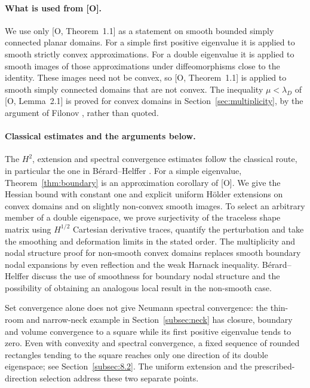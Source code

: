 \documentclass[11pt]{article}
\theoremstyle{definition}
\theoremstyle{remark}
\numberwithin{equation}{section}
\begin{document}
\paragraph{What is used from [O].}
We use only [O, Theorem~1.1] as a statement on smooth bounded simply connected planar domains. For a simple
first positive eigenvalue it is applied to smooth strictly convex approximations. For a double eigenvalue
it is applied to smooth images of those approximations under diffeomorphisms close to the identity. These
images need not be convex, so [O, Theorem~1.1] is applied to smooth simply connected domains that are not
convex. The inequality $\mu<\lambda_D$ of [O, Lemma~2.1] is proved for convex domains in
Section~\ref{sec:multiplicity}, by the argument of Filonov \cite{Filonov}, rather than quoted.

\paragraph{Classical estimates and the arguments below.}
The $H^2$, extension and spectral convergence estimates follow the classical route, in particular the one
in B\'erard--Helffer \cite[Section~2]{BH2021}. For a simple eigenvalue, Theorem~\ref{thm:boundary} is an
approximation corollary of [O]. We give the Hessian bound with constant one and explicit uniform H\"older
extensions on convex domains and on slightly non-convex smooth images. To select an arbitrary member of a
double eigenspace, we prove surjectivity of the traceless shape matrix using $H^{1/2}$ Cartesian derivative
traces, quantify the perturbation and take the smoothing and deformation limits in the stated order.
The multiplicity and nodal structure proof for non-smooth convex domains replaces smooth boundary nodal
expansions by even reflection and the weak Harnack inequality. B\'erard--Helffer
\cite[Remark~3.7(2)]{BH2021} discuss the use of smoothness for boundary nodal structure and the possibility of
obtaining an analogous local result in the non-smooth case.

Set convergence alone does not give Neumann spectral convergence: the thin-room and narrow-neck example
in Section~\ref{subsec:neck} has closure, boundary and volume convergence to a square while its first
positive eigenvalue tends to zero. Even with convexity and spectral convergence, a fixed sequence of
rounded rectangles tending to the square reaches only one direction of its double eigenspace; see
Section~\ref{subsec:8.2}. The uniform extension and the prescribed-direction selection address these two
separate points.
\end{document}
